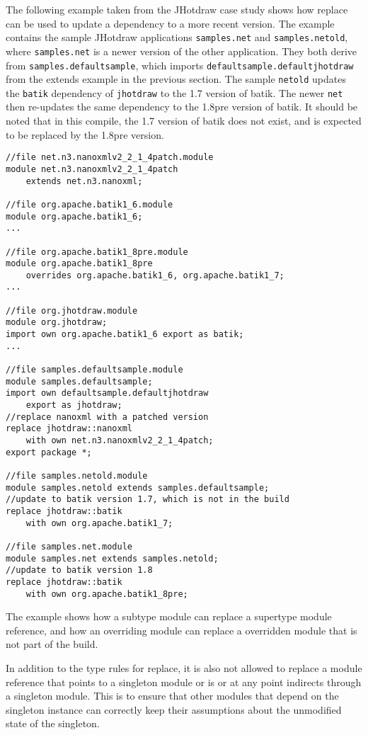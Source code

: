The following example taken from the JHotdraw case study shows how replace can
be used to update a dependency to a more recent version. The example contains
the sample JHotdraw applications \texttt{samples.net} and \texttt{samples.netold}, 
where \texttt{samples.net} is a newer version of the other application. They both 
derive from \texttt{samples.defaultsample}, which imports \texttt{defaultsample.defaultjhotdraw} 
from the extends example in the previous section. The sample \texttt{netold} updates 
the \texttt{batik} dependency of \texttt{jhotdraw} to the 1.7 version of batik.
The newer \texttt{net} then re-updates the same dependency to the 1.8pre version of batik.
It should be noted that in this compile, the 1.7 version of batik does not exist, and
is expected to be replaced by the 1.8pre version.

\begin{lstlisting}[caption=Replace]
//file net.n3.nanoxmlv2_2_1_4patch.module
module net.n3.nanoxmlv2_2_1_4patch 
	extends net.n3.nanoxml;

//file org.apache.batik1_6.module
module org.apache.batik1_6;
...

//file org.apache.batik1_8pre.module
module org.apache.batik1_8pre 
	overrides org.apache.batik1_6, org.apache.batik1_7;
...

//file org.jhotdraw.module
module org.jhotdraw;
import own org.apache.batik1_6 export as batik;
...

//file samples.defaultsample.module
module samples.defaultsample;
import own defaultsample.defaultjhotdraw 
	export as jhotdraw;
//replace nanoxml with a patched version
replace jhotdraw::nanoxml 
	with own net.n3.nanoxmlv2_2_1_4patch;
export package *;

//file samples.netold.module
module samples.netold extends samples.defaultsample;
//update to batik version 1.7, which is not in the build
replace jhotdraw::batik 
	with own org.apache.batik1_7;

//file samples.net.module
module samples.net extends samples.netold;
//update to batik version 1.8
replace jhotdraw::batik
	with own org.apache.batik1_8pre;
\end{lstlisting}

The example shows how a subtype module can replace a supertype module
reference, and how an overriding module can replace a overridden module
that is not part of the build.

In addition to the type rules for replace, it is also not allowed to 
replace a module reference that points to a singleton module or
is or at any point indirects through a singleton module. This is to ensure that other
modules that depend on the singleton instance can correctly keep their
assumptions about the unmodified state of the singleton.

